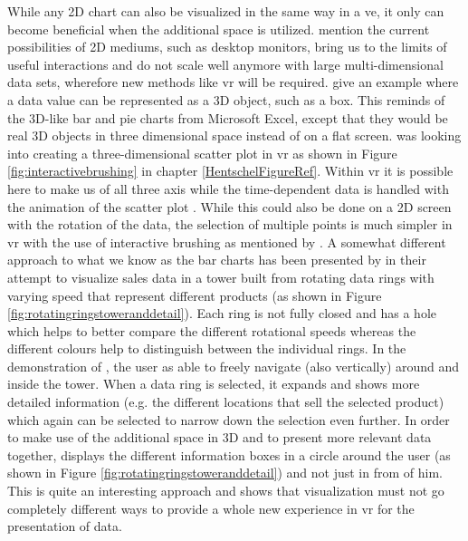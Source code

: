 While any 2D chart can also be visualized in the same way in a \gls{ve}, it only can become beneficial when the additional space is utilized. \cite{Jamieson2007} mention the current possibilities of 2D mediums, such as desktop monitors, bring us to the limits of useful interactions and do not scale well anymore with large multi-dimensional data sets, wherefore new methods like \gls{vr} will be required. \cite{Jamieson2007} give an example where a data value can be represented as a 3D object, such as a box. This reminds of the 3D-like bar and pie charts from Microsoft Excel, except that they would be real 3D objects in three dimensional space instead of on a flat screen. \newline
\cite{Hentschel2009} was looking into creating a three-dimensional scatter plot in \gls{vr} as shown in Figure \ref{fig:interactivebrushing} in chapter \ref{HentschelFigureRef}. Within \gls{vr} it is possible here to make us of all three axis while the time-dependent data is handled with the animation of the scatter plot \citep{Hentschel2009}. While this could also be done on a 2D screen with the rotation of the data, the selection of multiple points is much simpler in \gls{vr} with the use of interactive brushing as mentioned by \cite{Hentschel2009}. \newline
A somewhat different approach to what we know as the bar charts has been presented by \cite{CodeScience2015} in their attempt to visualize sales data in a tower built from rotating data rings with varying speed that represent different products (as shown in Figure \ref{fig:rotatingringstoweranddetail}). Each ring is not fully closed and has a hole which helps to better compare the different rotational speeds whereas the different colours help to distinguish between the individual rings. In the demonstration of \cite{CodeScience2015}, the user as able to freely navigate (also vertically) around and inside the tower. When a data ring is selected, it expands and shows more detailed information (e.g. the different locations that sell the selected product) which again can be selected to narrow down the selection even further. In order to make use of the additional space in 3D and to present more relevant data together, \cite{CodeScience2015} displays the different information boxes in a circle around the user (as shown in Figure \ref{fig:rotatingringstoweranddetail}) and not just in from of him. This is quite an interesting approach and shows that visualization must not go completely different ways to provide a whole new experience in \gls{vr} for the presentation of data. \newline
